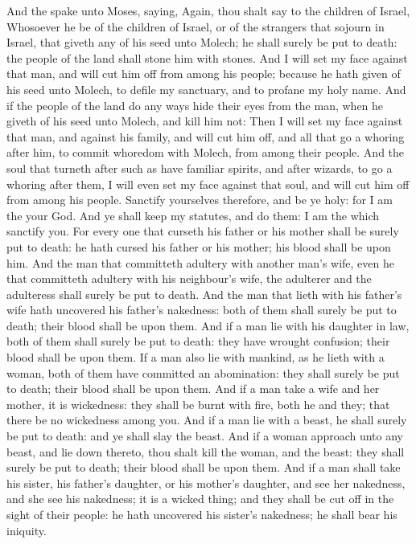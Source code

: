 \begin{biblechapter} %
 And the \LORD spake unto Moses, saying,
\verse Again, thou shalt say to the children of Israel, Whosoever he be of the children of Israel, or of the strangers that sojourn in Israel, that giveth any of his seed unto Molech; he shall surely be put to death: the people of the land shall stone him with stones.
\verse And I will set my face against that man, and will cut him off from among his people; because he hath given of his seed unto Molech, to defile my sanctuary, and to profane my holy name.
\verse And if the people of the land do any ways hide their eyes from the man, when he giveth of his seed unto Molech, and kill him not:
\verse Then I will set my face against that man, and against his family, and will cut him off, and all that go a whoring after him, to commit whoredom with Molech, from among their people.
\verse And the soul that turneth after such as have familiar spirits, and after wizards, to go a whoring after them, I will even set my face against that soul, and will cut him off from among his people.
\verse Sanctify yourselves therefore, and be ye holy: for I am the \LORD your God.
\verse And ye shall keep my statutes, and do them: I am the \LORD which sanctify you.
\verse For every one that curseth his father or his mother shall be surely put to death: he hath cursed his father or his mother; his blood shall be upon him.
\verse And the man that committeth adultery with another man's wife, even he that committeth adultery with his neighbour's wife, the adulterer and the adulteress shall surely be put to death.
\verse And the man that lieth with his father's wife hath uncovered his father's nakedness: both of them shall surely be put to death; their blood shall be upon them.
\verse And if a man lie with his daughter in law, both of them shall surely be put to death: they have wrought confusion; their blood shall be upon them.
\verse If a man also lie with mankind, as he lieth with a woman, both of them have committed an abomination: they shall surely be put to death; their blood shall be upon them.
\verse And if a man take a wife and her mother, it is wickedness: they shall be burnt with fire, both he and they; that there be no wickedness among you.
\verse And if a man lie with a beast, he shall surely be put to death: and ye shall slay the beast.
\verse And if a woman approach unto any beast, and lie down thereto, thou shalt kill the woman, and the beast: they shall surely be put to death; their blood shall be upon them.
\verse And if a man shall take his sister, his father's daughter, or his mother's daughter, and see her nakedness, and she see his nakedness; it is a wicked thing; and they shall be cut off in the sight of their people: he hath uncovered his sister's nakedness; he shall bear his iniquity.

\end{biblechapter}
